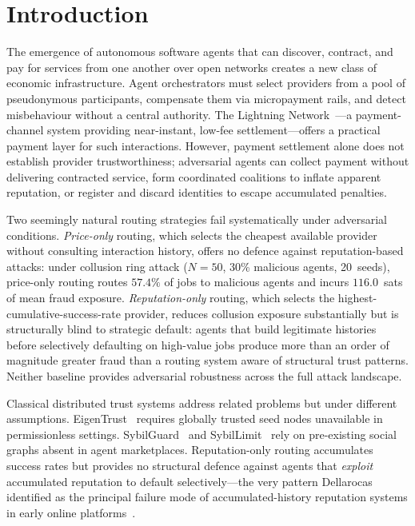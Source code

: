 \documentclass[sigconf,nonacm,10pt]{acmart}
\begin{document}

\maketitle

\section{Introduction}
\label{sec:intro}

The emergence of autonomous software agents that can discover,
contract, and pay for services from one another over open networks
creates a new class of economic infrastructure. Agent orchestrators
must select providers from a pool of pseudonymous participants,
compensate them via micropayment rails, and detect misbehaviour
without a central authority. The Lightning
Network~\cite{poon2016lightning}---a payment-channel system
providing near-instant, low-fee settlement---offers a practical
payment layer for such interactions. However, payment settlement
alone does not establish provider trustworthiness; adversarial
agents can collect payment without delivering contracted service,
form coordinated coalitions to inflate apparent reputation, or
register and discard identities to escape accumulated penalties.

Two seemingly natural routing strategies fail systematically under
adversarial conditions. \emph{Price-only} routing, which selects
the cheapest available provider without consulting interaction
history, offers no defence against reputation-based attacks: under
collusion ring attack ($N{=}50$, 30\% malicious agents,
20~seeds), price-only routing routes $57.4\%$ of jobs to malicious
agents and incurs $116.0$~sats of mean fraud exposure.
\emph{Reputation-only} routing, which selects the
highest-cumulative-success-rate provider, reduces collusion
exposure substantially but is structurally blind to strategic
default: agents that build legitimate histories before selectively
defaulting on high-value jobs produce more than an order of
magnitude greater fraud than a routing system aware of structural
trust patterns. Neither baseline provides adversarial robustness
across the full attack landscape.

Classical distributed trust systems address related problems but
under different assumptions.
EigenTrust~\cite{kamvar2003eigentrust} requires globally trusted
seed nodes unavailable in permissionless settings.
SybilGuard~\cite{yu2006sybilguard} and
SybilLimit~\cite{yu2008sybillimit} rely on pre-existing social
graphs absent in agent marketplaces. Reputation-only routing
accumulates success rates but provides no structural defence
against agents that \emph{exploit} accumulated reputation to
default selectively---the very pattern Dellarocas identified as
the principal failure mode of accumulated-history reputation
systems in early online platforms~\cite{dellarocas2003digitization}.
\end{document}
